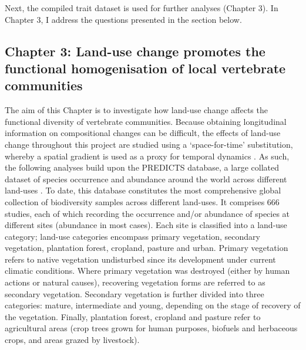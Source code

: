 Next, the compiled trait dataset is used for further analyses (Chapter 3). In Chapter 3, I address the questions presented in the section below.

\subsection{Chapter 3: Land-use change promotes the functional homogenisation of local vertebrate communities}

The aim of this Chapter is to investigate how land-use change affects the functional diversity of vertebrate communities. Because obtaining longitudinal information on compositional changes can be difficult, the effects of land-use change throughout this project are studied using a `space-for-time' substitution, whereby a spatial gradient is used as a proxy for temporal dynamics \citep{depalma2018}. As such, the following analyses  build upon the PREDICTS database, a large collated dataset of species occurrence and abundance around the world across different land-uses \citep{Hudson2014, Hudson2017}. To date, this database constitutes the most comprehensive global collection of biodiversity samples across different land-uses. It comprises 666 studies, each of which recording the occurrence and/or abundance  of species at different sites (abundance in most cases). Each site is classified into a land-use category; land-use categories encompass primary vegetation, secondary vegetation, plantation forest, cropland, pasture and urban. Primary vegetation refers to native vegetation undisturbed since its development under current climatic conditions. Where primary vegetation was destroyed (either by human actions or natural causes), recovering vegetation forms are referred to as secondary vegetation. Secondary vegetation is further divided into three categories: mature, intermediate and young, depending on the stage of recovery of the vegetation.
Finally, plantation forest, cropland and pasture refer to agricultural areas (crop trees grown for human purposes, biofuels and herbaceous crops, and areas grazed by livestock).

